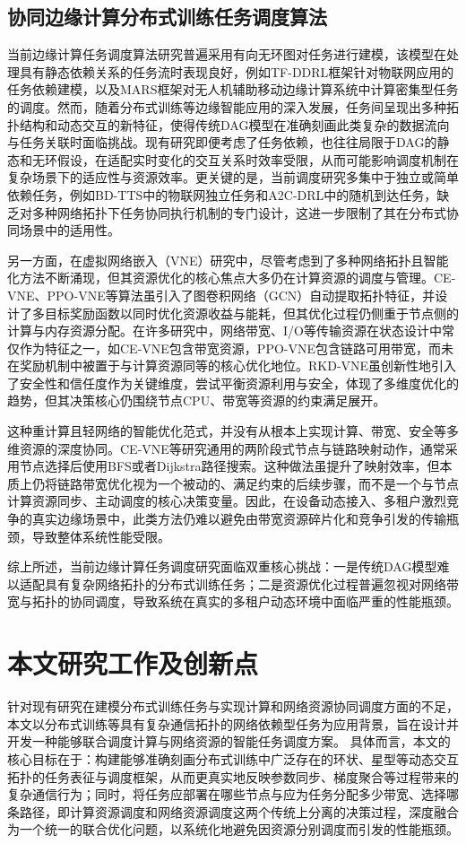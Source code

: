\subsection{协同边缘计算分布式训练任务调度算法}
当前边缘计算任务调度算法研究普遍采用有向无环图对任务进行建模，该模型在处理具有静态依赖关系的任务流时表现良好，例如TF-DDRL\cite{TF-DDRL}框架针对物联网应用的任务依赖建模，以及MARS\cite{MARS}框架对无人机辅助移动边缘计算系统中计算密集型任务的调度。然而，随着分布式训练等边缘智能应用的深入发展，任务间呈现出多种拓扑结构和动态交互的新特征，使得传统DAG模型在准确刻画此类复杂的数据流向与任务关联时面临挑战。现有研究\cite{TF-DDRL}即便考虑了任务依赖，也往往局限于DAG的静态和无环假设，在适配实时变化的交互关系时效率受限，从而可能影响调度机制在复杂场景下的适应性与资源效率。更关键的是，当前调度研究多集中于独立或简单依赖任务，例如BD-TTS\cite{BD-TTS}中的物联网独立任务和A2C-DRL\cite{A2C-DRL}中的随机到达任务，缺乏对多种网络拓扑下任务协同执行机制的专门设计，这进一步限制了其在分布式协同场景中的适用性。

另一方面，在虚拟网络嵌入（VNE）研究中，尽管考虑到了多种网络拓扑且智能化方法不断涌现，但其资源优化的核心焦点大多仍在计算资源的调度与管理。CE-VNE\cite{CE-VNE}、PPO-VNE\cite{PPO-VNE}等算法虽引入了图卷积网络（GCN）自动提取拓扑特征，并设计了多目标奖励函数以同时优化资源收益与能耗，但其优化过程仍侧重于节点侧的计算与内存资源分配。在许多研究中，网络带宽、I/O等传输资源在状态设计中常仅作为特征之一，如CE-VNE\cite{CE-VNE}包含带宽资源，PPO-VNE\cite{PPO-VNE}包含链路可用带宽，而未在奖励机制中被置于与计算资源同等的核心优化地位。RKD-VNE\cite{RKD-VNE}虽创新性地引入了安全性和信任度作为关键维度，尝试平衡资源利用与安全，体现了多维度优化的趋势，但其决策核心仍围绕节点CPU、带宽等资源的约束满足展开。

这种重计算且轻网络的智能优化范式，并没有从根本上实现计算、带宽、安全等多维资源的深度协同。CE-VNE\cite{CE-VNE}等研究通用的两阶段式节点与链路映射动作，通常采用节点选择后使用BFS或者Dijkstra路径搜索。这种做法虽提升了映射效率，但本质上仍将链路带宽优化视为一个被动的、满足约束的后续步骤，而不是一个与节点计算资源同步、主动调度的核心决策变量。因此，在设备动态接入、多租户激烈竞争的真实边缘场景中，此类方法仍难以避免由带宽资源碎片化和竞争引发的传输瓶颈，导致整体系统性能受限。

综上所述，当前边缘计算任务调度研究面临双重核心挑战：一是传统DAG模型难以适配具有复杂网络拓扑的分布式训练任务；二是资源优化过程普遍忽视对网络带宽与拓扑的协同调度，导致系统在真实的多租户动态环境中面临严重的性能瓶颈。

\section{本文研究工作及创新点}
针对现有研究在建模分布式训练任务与实现计算和网络资源协同调度方面的不足，本文以分布式训练等具有复杂通信拓扑的网络依赖型任务为应用背景，旨在设计并开发一种能够联合调度计算与网络资源的智能任务调度方案。
具体而言，本文的核心目标在于：构建能够准确刻画分布式训练中广泛存在的环状、星型等动态交互拓扑的任务表征与调度框架，从而更真实地反映参数同步、梯度聚合等过程带来的复杂通信行为；同时，将任务应部署在哪些节点与应为任务分配多少带宽、选择哪条路径，即计算资源调度和网络资源调度这两个传统上分离的决策过程，深度融合为一个统一的联合优化问题，以系统化地避免因资源分别调度而引发的性能瓶颈。

